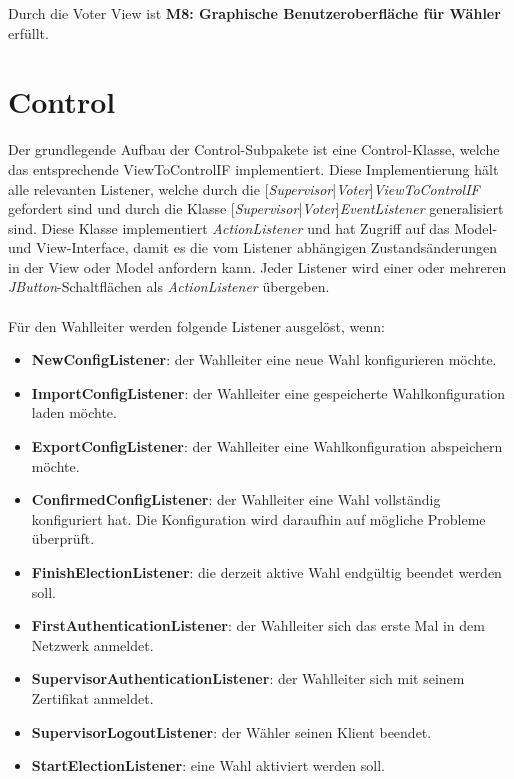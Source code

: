 \documentclass[parskip=full]{scrartcl}
\newcommand{\textitx}[1]{\mbox{\textit{#1}}}
\newcommand{\fakeparagraph}[1]{\textbf{#1}}
\begin{document}
		Durch die Voter View ist \textbf{M8: Graphische Benutzeroberfläche für Wähler} erfüllt.
	\newpage

	\section{Control}\label{sec:control}
	Der grundlegende Aufbau der Control-Subpakete ist eine Control-Klasse, welche das entsprechende ViewToControlIF implementiert. Diese Implementierung hält alle relevanten Listener, welche durch die [\textitx{Supervisor}|\textitx{Voter}]\textitx{ViewToControlIF} gefordert sind und durch die Klasse [\textitx{Supervisor}|\textitx{Voter}]\textitx{EventListener} generalisiert sind. Diese Klasse implementiert \textitx{ActionListener} und hat Zugriff auf das Model- und View-Interface, damit es die vom Listener abhängigen Zustandsänderungen in der View oder Model anfordern kann. Jeder Listener wird einer oder mehreren \textitx{JButton}-Schaltflächen als \textitx{ActionListener} übergeben.\\
	\\
	Für den Wahlleiter werden folgende Listener ausgelöst, wenn:
	\begin{itemize}
		\item\fakeparagraph{NewConfigListener}: der Wahlleiter eine neue Wahl konfigurieren möchte.
		\item\fakeparagraph{ImportConfigListener}: der Wahlleiter eine gespeicherte Wahlkonfiguration laden möchte.
		\item\fakeparagraph{ExportConfigListener}: der Wahlleiter eine Wahlkonfiguration abspeichern möchte.
		\item\fakeparagraph{ConfirmedConfigListener}: der Wahlleiter eine Wahl vollständig konfiguriert hat. Die Konfiguration wird daraufhin auf mögliche Probleme überprüft.
		\item\fakeparagraph{FinishElectionListener}: die derzeit aktive Wahl endgültig beendet werden soll. 
		\item\fakeparagraph{FirstAuthenticationListener}: der Wahlleiter sich das erste Mal in dem Netzwerk anmeldet.
		\item\fakeparagraph{SupervisorAuthenticationListener}: der Wahlleiter sich mit seinem Zertifikat anmeldet.
		\item\fakeparagraph{SupervisorLogoutListener}: der Wähler seinen Klient beendet.
		\item\fakeparagraph{StartElectionListener}: eine Wahl aktiviert werden soll.
	\end{itemize}
	
\end{document}
